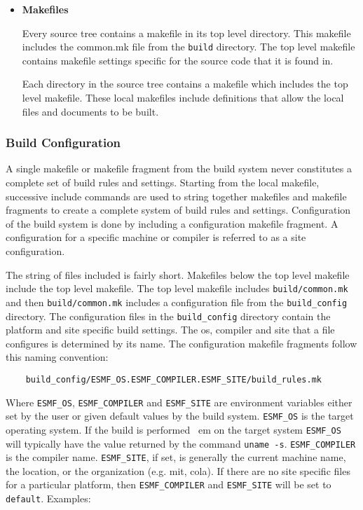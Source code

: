 \begin{itemize}
\begin{description}
\end{description}


\item{{\bf Makefiles}}

Every source tree contains a makefile in its top level directory.  This
makefile includes the common.mk file from the {\tt build} directory.
The top level makefile contains makefile settings specific for the
source code that it is found in.

Each directory in the source tree contains a makefile which includes
the top level makefile.  These local makefiles include definitions that
allow the local files and documents to be built.
\end{itemize}

\subsubsection{Build Configuration}

A single makefile or makefile fragment from the build system never
constitutes a complete set of build rules and settings.  Starting from
the local makefile, successive include commands are used to string
together makefiles and makefile fragments to create a complete system
of build rules and settings.  Configuration of the build system is
done by including a configuration makefile fragment. A configuration for a
specific machine or compiler is referred to as a site configuration.

The string of files included is fairly short.  Makefiles below the top
level makefile include the top level makefile. The top level makefile
includes {\tt build/common.mk} and then {\tt build/common.mk} includes a
configuration file from the {\tt build\_config} directory.  The configuration
files in the {\tt build\_config} directory contain the platform and site
specific build settings.  The os, compiler and site that a file
configures is determined by its name.  The configuration makefile
fragments follow this naming convention:

\begin{verbatim}
    build_config/ESMF_OS.ESMF_COMPILER.ESMF_SITE/build_rules.mk
\end{verbatim}

Where {\tt ESMF\_OS}, {\tt ESMF\_COMPILER} and {\tt ESMF\_SITE} are environment
variables either set by the user or given default values by the build
system. {\tt ESMF\_OS} is the target operating system. If the build is performed
{\ em on} the target system {\tt ESMF\_OS} will typically have the value
returned by the command {\tt uname -s}. {\tt ESMF\_COMPILER} is the compiler
name. {\tt ESMF\_SITE}, if set, is generally the current machine name, the
location, or the organization (e.g. mit, cola).  If there are no site specific
files for a particular platform, then {\tt ESMF\_COMPILER} and {\tt ESMF\_SITE}
will be set to {\tt default}.  Examples:

